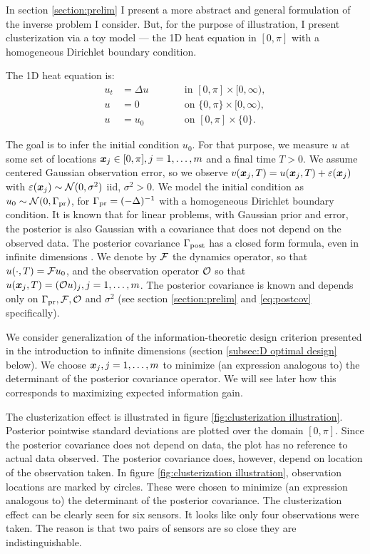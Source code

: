 In section \ref{section:prelim} I present a more abstract and general
formulation of the inverse problem I consider. But, for the purpose of
illustration, I present clusterization via a toy model --- the 1D heat
equation in $[0,\pi]$ with a homogeneous Dirichlet boundary condition.

The 1D heat equation is:
\begin{subequations}\label{eq:heat equation}
  \begin{alignat}{2}
    u_t &= \Delta u &&\qquad \text{in } [0,\pi] \times [0,\infty),\\
      u &= 0 &&\qquad \text{on } \{0, \pi\} \times [0,\infty),\\
        u &= u_0 &&\qquad \text{on }[0,\pi] \times \{0\}.
  \end{alignat}
\end{subequations}

The goal is to infer the initial condition $u_0$. For that purpose, we
measure $u$ at some set of locations ${\boldsymbol{x}}_j \in [0,\pi], j=1, \dots,m$
and a final time $T > 0$. We assume centered Gaussian observation
error, so we observe $v({\boldsymbol{x}}_j,T) = u({\boldsymbol{x}}_j,T) + \varepsilon({\boldsymbol{x}}_j)$ with
$\varepsilon({\boldsymbol{x}}_j) \sim \mathcal{N}(0, \sigma^2)$ iid, $\sigma^2 > 0$. We model
the initial condition as $u_0 \sim \mathcal{N}(0,\Gamma_{\textup{pr}})$, for $\Gamma_{\textup{pr}} =
(-\Delta)^{-1}$ with a homogeneous Dirichlet boundary condition. It is
known \cite{Tarantola05} that for linear problems, with Gaussian prior
and error, the posterior is also Gaussian with a covariance that does
not depend on the observed data. The posterior covariance $\Gamma_{\textup{post}}$
has a closed form formula, even in infinite dimensions
\cite{Stuart10}. We denote by $\mathcal{F}$ the dynamics operator, so that
$u( \cdot,T) = \mathcal{F} u_0$, and the observation operator $\mathcal{O}$ so that
$u({\boldsymbol{x}}_j,T) = (\mathcal{O} u)_j, j=1,\dots,m$. The posterior covariance is
known and depends only on $\Gamma_{\textup{pr}}, \mathcal{F}, \mathcal{O}$ and $\sigma^2$ (see
section \ref{section:prelim} and \eqref{eq:postcov} specifically).

We consider generalization of the information-theoretic design
criterion presented in the introduction to infinite dimensions
(section \ref{subsec:D optimal design} below). We choose
${\boldsymbol{x}}_j,j=1,\dots,m$ to minimize (an expression analogous to) the
determinant of the posterior covariance operator. We will see later
how this corresponds to maximizing expected information gain.

The clusterization effect is illustrated in figure
\ref{fig:clusterization illustration}. Posterior pointwise standard
deviations are plotted over the domain $[0, \pi]$. Since the posterior
covariance does not depend on data, the plot has no reference to
actual data observed. The posterior covariance does, however, depend
on location of the observation taken. In figure
\ref{fig:clusterization illustration}, observation locations are
marked by circles. These were chosen to minimize (an expression
analogous to) the determinant of the posterior covariance. The
clusterization effect can be clearly seen for six sensors. It looks
like only four observations were taken. The reason is that two pairs
of sensors are so close they are indistinguishable.


